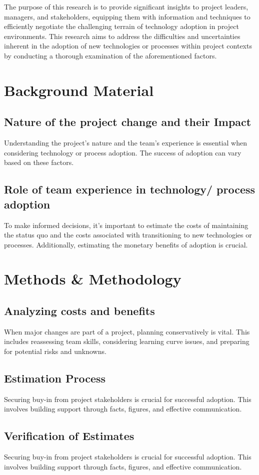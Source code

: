 \documentclass{article}
\begin{document}
The purpose of this research is to provide significant insights to project leaders, managers, and stakeholders, equipping them with information and techniques to efficiently negotiate the challenging terrain of technology adoption in project environments. This research aims to address the difficulties and uncertainties inherent in the adoption of new technologies or processes within project contexts by conducting a thorough examination of the aforementioned factors.


\section{Background Material}
\subsection{Nature of the project change and their Impact}
Understanding the project's nature and the team's experience is essential when considering technology or process adoption. The success of adoption can vary based on these factors.
\subsection{Role of team experience in technology/ process adoption}
To make informed decisions, it's important to estimate the costs of maintaining the status quo and the costs associated with transitioning to new technologies or processes. Additionally, estimating the monetary benefits of adoption is crucial.

\section{Methods \& Methodology}
\subsection{Analyzing costs and benefits}
When major changes are part of a project, planning conservatively is vital. This includes reassessing team skills, considering learning curve issues, and preparing for potential risks and unknowns.
\subsection{Estimation Process}
Securing buy-in from project stakeholders is crucial for successful adoption. This involves building support through facts, figures, and effective communication.
\subsection{Verification of Estimates}
Securing buy-in from project stakeholders is crucial for successful adoption. This involves building support through facts, figures, and effective communication.
\end{document}
